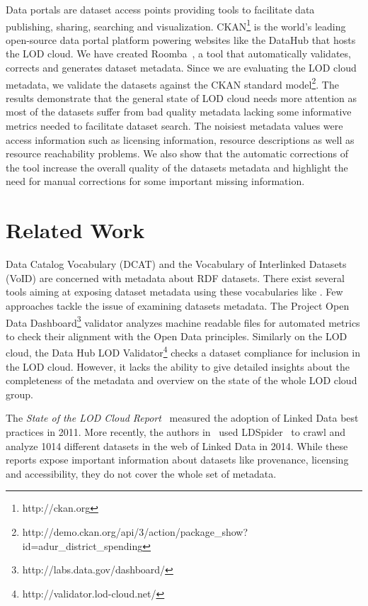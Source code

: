 \documentclass[runningheads,a4paper]{llncs}
\begin{document}
Data portals are dataset access points providing tools to facilitate data publishing, sharing, searching and visualization. CKAN\footnote{http://ckan.org} is the world's leading open-source data portal platform powering websites like the DataHub that hosts the LOD cloud. We have created Roomba~\cite{+4525}, a tool that automatically validates, corrects and generates dataset metadata. Since we are evaluating the LOD cloud metadata, we validate the datasets against the CKAN standard model\footnote{http://demo.ckan.org/api/3/action/package\_show?id=adur\_district\_spending}. The results demonstrate that the general state of LOD cloud needs more attention as most of the datasets suffer from bad quality metadata lacking some informative metrics needed to facilitate dataset search. The noisiest metadata values were access information such as licensing information, resource descriptions as well as resource reachability problems. We also show that the automatic corrections of the tool increase the overall quality of the datasets metadata and highlight the need for manual corrections for some important missing information.


\section{Related Work}
\label{sec:related-work}

Data Catalog Vocabulary (DCAT) \cite{Erickson:14:DCV} and the Vocabulary of Interlinked Datasets (VoID) \cite{Cyganiak:11:DLD} are concerned with metadata about RDF datasets. There exist several tools aiming at exposing dataset metadata using these vocabularies like \cite{BoHm:2011:CVD:2030805.2031001}.
Few approaches tackle the issue of examining datasets metadata. The Project Open Data Dashboard\footnote{http://labs.data.gov/dashboard/} validator analyzes machine readable files for automated metrics to check their alignment with the Open Data principles. Similarly on the LOD cloud, the Data Hub LOD Validator\footnote{http://validator.lod-cloud.net/} checks a dataset compliance for inclusion in the LOD cloud. However, it lacks the ability to give detailed insights about the completeness of the metadata and overview on the state of the whole LOD cloud group.

The \textit{State of the LOD Cloud Report}~\cite{SOLOD} measured the adoption of Linked Data best practices in 2011. More recently, the authors in~\cite{DBLP:conf/semweb/SchmachtenbergBP14} used LDSpider~\cite{conf/semweb/IseleUBH10} to crawl and analyze 1014 different datasets in the web of Linked Data in 2014. While these reports expose important information about datasets like provenance, licensing and accessibility, they do not cover the whole set of metadata.
\end{document}
